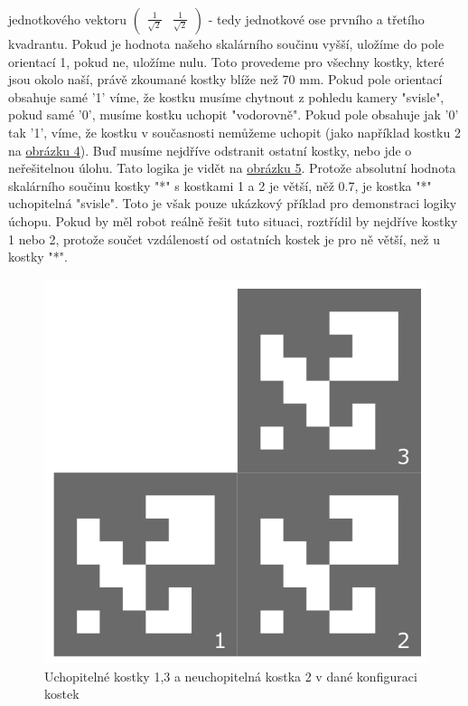 \documentclass[journal,twoside,web]{ieeecolor}
\begin{document}
            jednotkového vektoru $\begin{pmatrix}\frac{1}{\sqrt{2}}&\frac{1}{\sqrt{2}}\end{pmatrix}$ - tedy jednotkové ose prvního a třetího kvadrantu. Pokud je hodnota
            našeho skalárního součinu vyšší, uložíme do pole orientací 1, pokud ne, uložíme nulu. Toto provedeme pro všechny kostky, které jsou okolo naší, právě zkoumané kostky
            blíže než 70 mm. Pokud pole orientací obsahuje samé '1' víme, že kostku musíme chytnout z pohledu kamery "svisle", pokud samé '0', musíme kostku uchopit "vodorovně".
            Pokud pole obsahuje jak '0' tak '1', víme, že kostku v současnosti nemůžeme uchopit (jako například kostku 2 na \hyperlink{cube_config}{obrázku 4}). Buď musíme nejdříve odstranit ostatní kostky, nebo jde o neřešitelnou úlohu.
            Tato logika je vidět na \hyperlink{scalar_logic}{obrázku 5}. Protože absolutní hodnota skalárního součinu kostky "*" s kostkami 1 a 2 je větší, něž 0.7, je kostka "*"
            uchopitelná "svisle". Toto je však pouze ukázkový příklad pro demonstraci logiky úchopu. Pokud by měl robot reálně řešit tuto situaci, 
            roztřídil by nejdříve kostky 1 nebo 2, protože součet vzdáleností od ostatních kostek je pro ně větší, než u kostky "*".

        \begin{figure}[h!]
            \centering
            \hypertarget{cube_config}{}
            \includegraphics[width=0.8\linewidth]{images/neuchopitelna}
            \caption{Uchopitelné kostky 1,3 a neuchopitelná kostka 2 v dané konfiguraci kostek}
            \label{fig:cube_config}
        \end{figure}\\
\end{document}

